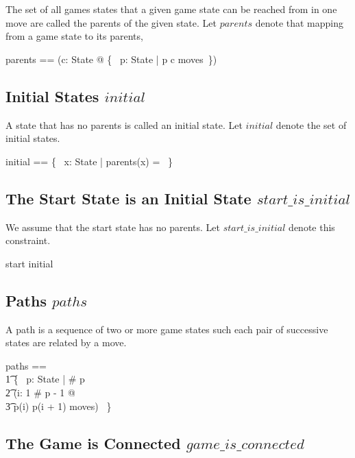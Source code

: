 \documentclass[11pt, oneside]{article}
\begin{document}
The set of all games states that a given game state can be reached from in one move
are called the parents of the given state.
Let $parents$ denote that mapping from a game state to its parents,

\begin{zed}
parents == (\lambda c: State @ \{~ p: State | p \mapsto c \in moves~\})
\end{zed}

\subsection{Initial States $initial$}

A state that has no parents is called an initial state.
Let $initial$ denote the set of initial states.

\begin{zed}
initial == \{~ x: State | parents(x) = \emptyset ~\}
\end{zed}

\subsection{The Start State is an Initial State $start\_is\_initial$}

We assume that the start state has no parents.
Let $start\_is\_initial$ denote this constraint.

\begin{zed}
start \in initial
\end{zed}

\subsection{Paths $paths$}

A path is a sequence of two or more game states such each pair of successive states are
related by a move.

\begin{zed}
paths == \\
\t1	\{~ p: \seq State | \# p   \land \\
\t2		(\forall i: 1 \upto \# p - 1 @ \\
\t3			p(i) \mapsto p(i + 1) \in moves) ~\}
\end{zed}

\subsection{The Game is Connected $game\_is\_connected$}
\end{document}
